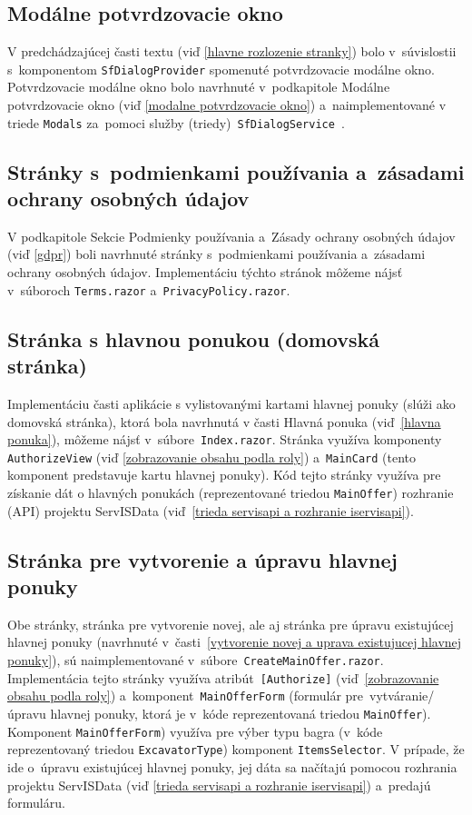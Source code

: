 \subsection{Modálne potvrdzovacie okno}
\label{modalne potvrdzovacie okno2}

V predchádzajúcej časti textu (viď \ref{hlavne rozlozenie stranky}) bolo v~súvislostii s~komponentom \verb|SfDialogProvider| spomenuté potvrdzovacie modálne okno. Potvrdzovacie modálne okno bolo navrhnuté v~podkapitole Modálne potvrdzovacie okno (viď \ref{modalne potvrdzovacie okno}) a~naimplementované v triede \verb|Modals| za~pomoci služby (triedy)~\texttt{SfDialogService}~\cite{sfdialogservice}.

\subsection{Stránky s~podmienkami používania a~zásadami ochrany osobných údajov}

V podkapitole Sekcie Podmienky používania a~Zásady ochrany osobných údajov (viď \ref{gdpr}) boli navrhnuté stránky s~podmienkami používania a~zásadami ochrany osobných údajov. Implementáciu týchto stránok môžeme nájsť v~súboroch \verb|Terms.razor| a~\verb|PrivacyPolicy.razor|.

\subsection{Stránka s hlavnou ponukou (domovská stránka)}

Implementáciu časti aplikácie s vylistovanými kartami hlavnej ponuky (slúži ako domovská stránka), ktorá bola navrhnutá v časti Hlavná ponuka (viď~\ref{hlavna ponuka}), môžeme nájsť v~súbore~\verb|Index.razor|. Stránka využíva komponenty \verb|AuthorizeView| (viď \ref{zobrazovanie obsahu podla roly}) a~\verb|MainCard| (tento komponent predstavuje kartu hlavnej ponuky). Kód tejto stránky využíva pre získanie dát o hlavných ponukách (reprezentované triedou \verb|MainOffer|) rozhranie (API) projektu ServISData (viď~\ref{trieda servisapi a rozhranie iservisapi}).

\subsection{Stránka pre vytvorenie a úpravu hlavnej ponuky}

Obe stránky, stránka pre vytvorenie novej, ale aj stránka pre úpravu existujúcej hlavnej ponuky (navrhnuté v~časti~\ref{vytvorenie novej a uprava existujucej hlavnej ponuky}), sú naimplementované v~súbore~\verb|CreateMainOffer.razor|. Implementácia tejto stránky využíva atribút~\verb|[Authorize]| (viď~\ref{zobrazovanie obsahu podla roly}) a~komponent~\verb|MainOfferForm| (formulár pre~vytváranie/úpravu hlavnej ponuky, ktorá je v~kóde reprezentovaná triedou \verb|MainOffer|). Komponent \verb|MainOfferForm|) využíva pre výber typu bagra (v~kóde reprezentovaný triedou \verb|ExcavatorType|) komponent \verb|ItemsSelector|. V prípade, že ide o~úpravu existujúcej hlavnej ponuky, jej dáta sa načítajú pomocou rozhrania projektu ServISData (viď \ref{trieda servisapi a rozhranie iservisapi}) a~predajú formuláru.

